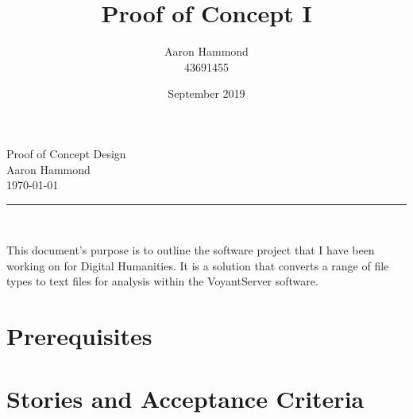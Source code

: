 \documentclass{article}
\title{Proof of Concept I}
\author{Aaron Hammond\\43691455}
\date{September 2019}
\newcommand\HRule{\rule{\textwidth}{1pt}} %
\begin{document}
\begin{center}
\huge{Proof of Concept Design}\\[0.4cm]
\huge{Aaron Hammond}\\[0.3cm]
\large{\today}\\[0.4cm]

\HRule \\[1cm]
\end{center}


This document's purpose is to outline the software project that I have been working on for Digital Humanities. It is a solution that converts a range of file types to text files for analysis within the VoyantServer software. 

\section{Prerequisites}


\section{Stories and Acceptance Criteria}
\end{document}
